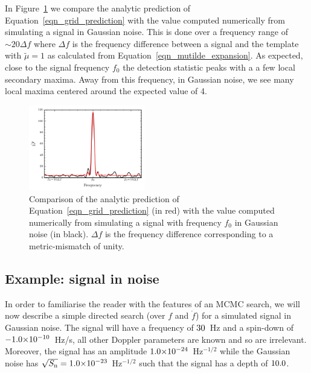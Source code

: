 \documentclass[aps, prd, twocolumn, superscriptaddress, floatfix, showpacs, nofootinbib, longbibliography]{revtex4-1}
\begin{document}
In Figure~\ref{fig_grid_frequency} we compare the analytic prediction of
Equation~\eqref{eqn_grid_prediction} with the value computed numerically from
simulating a signal in Gaussian noise. This is done over a frequency range of
$\sim20\Delta f$ where $\Delta f$ is the frequency difference between a signal
and the template with $\tilde{\mu}=1$ as calculated from
Equation~\eqref{eqn_mutilde_expansion}. As expected, close to the signal
frequency $f_0$ the detection statistic peaks with a a few local secondary
maxima. Away from this frequency, in Gaussian noise, we see many local maxima
centered around the expected value of 4.
\begin{figure}[htb]
\centering \includegraphics[width=0.45\textwidth]{grided_frequency_search_1D}
\caption{Comparison of the analytic prediction of
Equation~\eqref{eqn_grid_prediction} (in red) with the value computed
numerically from simulating a signal with frequency $f_0$ in Gaussian noise (in
black). $\Delta f$ is the frequency difference corresponding to a
metric-mismatch of unity.}
\label{fig_grid_frequency}
\end{figure}

\subsection{Example: signal in noise}

In order to familiarise the reader with the features of an MCMC search, we will
now describe a simple directed search (over $f$ and $\dot{f}$) for a simulated
signal in Gaussian noise. The signal will have a frequency of
$30$~Hz and a spin-down of $-1.0{\times}10^{-10}$~Hz/s, all other
Doppler parameters are known and so are irrelevant. Moreover, the signal has an
amplitude $1.0{\times}10^{-24}$~Hz$^{-1/2}$ while the Gaussian noise has
$\sqrt{S_{\rm n}}=1.0{\times}10^{-23}$~Hz$^{-1/2}$ such that the signal has a depth
of $10.0$.
\end{document}
